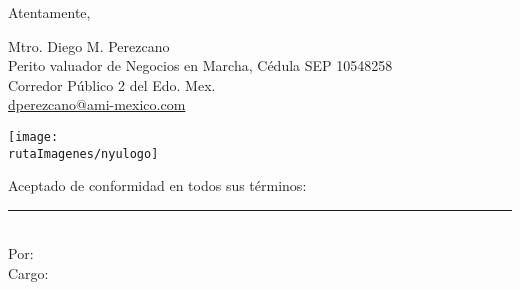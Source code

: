 \documentclass[5pt,letter]{article}
\begin{document}
 Atentamente,\\
 
\begin{minipage}{.7\textwidth}
 \textcolor{principal}{Mtro. Diego M. Perezcano}\\
 Perito valuador de Negocios en Marcha, Cédula SEP 10548258\\
 Corredor Público 2 del Edo. Mex.\\
 \url{dperezcano@ami-mexico.com}
 \end{minipage}
 
 \texttt{[image: \\rutaImagenes/nyulogo]}\\
 
 \begin{flushright}
\textcolor{principal}{Aceptado de conformidad en todos sus términos:}\\[10pt]

\rule{5cm}{1pt}\\
\textcolor{principal}{Por: \personaSolicitante}\\
\textcolor{principal}{Cargo: \caracterSolicitante}

 \end{flushright}
 
 
 
 
\end{document}
